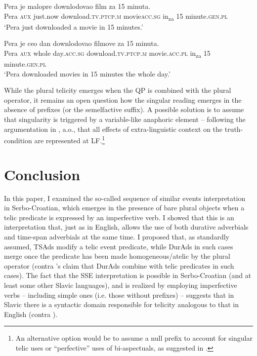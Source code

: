 \documentclass[output=paper,colorlinks,citecolor=brown]{langscibook}
\begin{document}
\ea \label{mil:ex:BV-singular}
{
\gll Pera je malopre downlodovao film za 15 minuta. \\ 
     Pera \textsc{aux} {just.now} download.\textsc{tv.ptcp.m} movie\textsc{acc.sg} in\textsubscript{za} 15 minute.\textsc{gen.pl}
\\
\glt `Pera just downloaded a movie in 15 minutes.'}
\z

\ea \label{mil:ex:BV-plural}
{
\gll Pera je ceo dan downlodovao filmove za 15 minuta. \\ Pera \textsc{aux} whole day.\textsc{acc.sg} download.\textsc{tv.ptcp.m} movie.\textsc{acc.pl} in\textsubscript{za} 15 minute.\textsc{gen.pl}
\\
\glt `Pera downloaded movies in 15 minutes the whole day.'}
\z

\noindent While the plural telicity emerges when the QP is combined with the plural operator, it remains an open question how the singular reading emerges in the absence of prefixes (or the semelfactive suffix). A possible solution is to assume that singularity is triggered by a variable-like anaphoric element -- following the argumentation in \citet{Stanley2000, StanleySzabo2000}, a.o., that all effects of extra-linguistic context on the truth-condition are represented at LF.\footnote{An alternative option would be to assume a null prefix to account for singular telic uses or ``perfective'' uses of bi-aspectuals, as suggested in \citet[]{Grickat1957/8, Grickat1966/7, Łazorczyk2010}.}

\section{Conclusion} \label{mil:sec:Conclusion}

In this paper, I examined the so-called sequence of similar events interpretation in Serbo-Croatian, which emerges in the presence of bare plural objects when a telic predicate is expressed by an imperfective verb. I showed that this is an interpretation that, just as in English, allows the use of both durative adverbials and time-span adverbials at the same time. I proposed that, as standardly assumed, TSAds modify a telic event predicate, while DurAds in such cases merge once the predicate has been made homogeneous/atelic by the plural operator (contra \citeauthor{MacDonald_2008}'s \citeyear{MacDonald_2008} claim that DurAds combine with telic predicates in such cases). The fact that the SSE interpretation is possible in Serbo-Croatian (and at least some other Slavic languages), and is realized by employing imperfective verbs -- including simple ones (i.e. those without prefixes) -- suggests that in Slavic there is a syntactic domain responsible for telicity analogous to that in English (contra \citealt{MacDonald_2008}).
\end{document}
